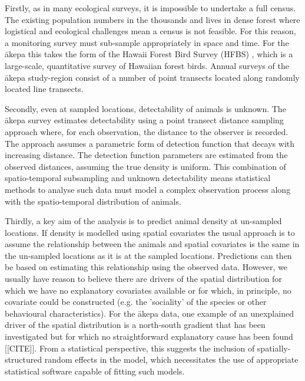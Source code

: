 \documentclass[preprint,12pt]{elsarticle}
\newcommand{\akepa}{\textquotesingle\={a}kepa}  %
\begin{document}
Firstly, as in many ecological surveys, it is impossible to undertake a full census.  The existing population numbers in the thousands and lives in dense forest where logistical and ecological challenges mean a census is not feasible.  For this reason, a monitoring survey must sub-sample appropriately in space and time.  For the \akepa{} this takes the form of the Hawaii Forest Bird Survey (HFBS) \citep{scott_HFBS_1986}, which is a large-scale, quantitative survey of Hawaiian forest birds.  Annual surveys of the \akepa{} study-region consist of a number of point transects located along randomly located line transects.    

Secondly, even at sampled locations, detectability of animals is unknown.  The \akepa{} survey estimates detectability using a point transect distance sampling approach \citep{buckland_distance_2015} where, for each observation, the distance to the observer is recorded.  The approach assumes a parametric form of detection function that decays with increasing distance.  The detection function parameters are estimated from the observed distances, assuming the true density is uniform. This combination of spatio-temporal subsampling and unknown detectability means statistical methods to analyse such data must model a complex observation process along with the spatio-temporal distribution of animals.  

Thirdly, a key aim of the analysis is to predict animal density at un-sampled locations.  If density is modelled using spatial covariates the usual approach is to assume the relationship between the animals and spatial covariates is the same in the un-sampled locations as it is at the sampled locations.  Predictions can then be based on estimating this relationship using the observed data.  However, we usually have reason to believe there are drivers of the spatial distribution for which we have no explanatory covariates available or for which, in principle, no covariate could be constructed (e.g. the 'sociality' of the species or other behavioural characteristics).  For the \akepa{} data, one example of an unexplained driver of the spatial distribution is a north-south gradient that has been investigated but for which no straightforward explanatory cause has been found [[CITE]].  From a statistical perspective, this suggests the inclusion of spatially-structured random effects in the model, which necessitates the use of appropriate statistical software capable of fitting such models.
\end{document}
